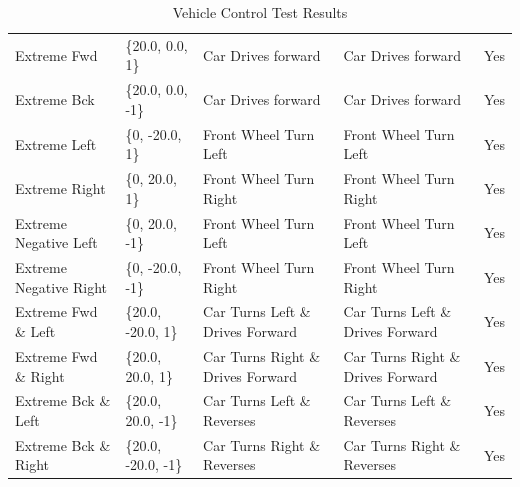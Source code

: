 \begin{table}[ht]
\begin{tabular}{lllll}
Extreme Fwd & \{20.0, 0.0, 1\} & Car Drives forward & Car Drives forward & Yes \\
Extreme Bck & \{20.0, 0.0, -1\} & Car Drives forward & Car Drives forward & Yes \\
Extreme Left & \{0, -20.0, 1\} & Front Wheel Turn Left & Front Wheel Turn Left & Yes \\
Extreme Right & \{0, 20.0, 1\} & Front Wheel Turn Right & Front Wheel Turn Right & Yes \\
Extreme Negative Left & \{0, 20.0, -1\} & Front Wheel Turn Left & Front Wheel Turn Left & Yes \\
Extreme Negative Right & \{0, -20.0, -1\} & Front Wheel Turn Right & Front Wheel Turn Right & Yes \\
Extreme Fwd \& Left & \{20.0, -20.0, 1\} & Car Turns Left \& Drives Forward & Car Turns Left \& Drives Forward & Yes \\
Extreme Fwd \& Right & \{20.0, 20.0, 1\} & Car Turns Right \& Drives Forward & Car Turns Right \& Drives Forward & Yes \\
Extreme Bck \& Left & \{20.0, 20.0, -1\} & Car Turns Left \& Reverses & Car Turns Left \& Reverses & Yes \\
Extreme Bck \& Right & \{20.0, -20.0, -1\} & Car Turns Right \& Reverses & Car Turns Right \& Reverses & Yes \\

\bottomrule
\end{tabular}
\caption{Vehicle Control Test Results}
\label{tab:vehicle_tests}
\end{table}
